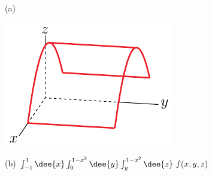 %

\begin{answer}
(a)
\begin{center}
     \includegraphics{fig/OE13D_8.pdf}
\end{center}

(b) $\int_{-1}^1\dee{x}\int_0^{1-x^2}\dee{y}\int_y^{1-x^2}\dee{z}\ f(x,y,z)$
\end{answer}

